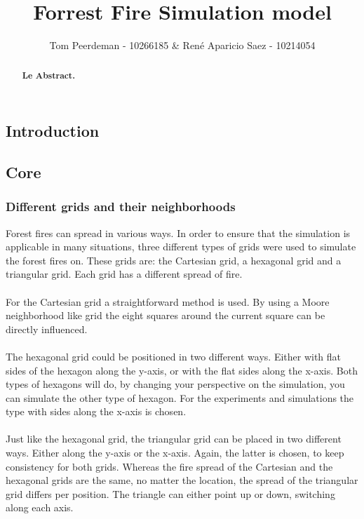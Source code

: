 \documentclass{article}
\title{Forrest Fire Simulation model}
\author{Tom Peerdeman - 10266185 \& Ren\'e Aparicio Saez - 10214054}
\newenvironment{Figure}
  {\par\medskip\noindent\minipage{\linewidth}}
  {\endminipage\par\medskip}
\begin{document}
\maketitle

\begin{abstract}
\textbf{Le Abstract.}
\end{abstract}

\begin{multicols}{2}
\subsection*{Introduction}

\subsection*{Core}
\subsubsection*{Different grids and their neighborhoods}
Forest fires can spread in various ways. In order to ensure that the simulation is applicable in many situations, three different types of grids were used to simulate the forest fires on. These grids are: the Cartesian grid, a hexagonal grid and a triangular grid. Each grid has a different spread of fire.\\\\
For the Cartesian grid a straightforward method is used. By using a Moore neighborhood like grid the eight squares around the current square can be directly influenced.\\\\
The hexagonal grid could be positioned in two different ways. Either with flat sides of the hexagon along the y-axis, or with the flat sides along the x-axis. Both types of hexagons will do, by changing your perspective on the simulation, you can simulate the other type of hexagon. For the experiments and simulations the type with sides along the x-axis is chosen.\\\\
Just like the hexagonal grid, the triangular grid can be placed in two different ways. Either along the y-axis or the x-axis. Again, the latter is chosen, to keep consistency for both grids. Whereas the fire spread of the Cartesian and the hexagonal grids are the same, no matter the location, the spread of the triangular grid differs per position. The triangle can either point up or down, switching along each axis.
\begin{Figure}

\end{Figure}
\end{multicols}
\end{document}
